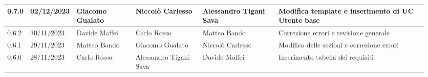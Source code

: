 \begin{table}[H]
\begin{tabularx}{\textwidth}{X|X|X|X|X|X}
		\hline
		0.7.0                 & 02/12/2023           & Giacomo Gualato        & Niccolò Carlesso       & Alessandro Tigani Sava & Modifica template e inserimento di UC Utente base          \\
		\hline
		0.6.2                 & 30/11/2023           & Davide Maffei          & Carlo Rosso            & Matteo Bando           & Correzione errori e revisione generale                     \\
		\hline
		0.6.1                 & 29/11/2023           & Matteo Bando           & Giacomo Gualato        & Niccolò Carlesso       & Modifica delle sezioni e correzione errori                 \\
		\hline
		0.6.0                 & 28/11/2023           & Carlo Rosso            & Alessandro Tigani Sava & Davide Maffei          & Inserimento tabella dei requisiti                          \\
		\bottomrule
	\end{tabularx}
\end{table}


